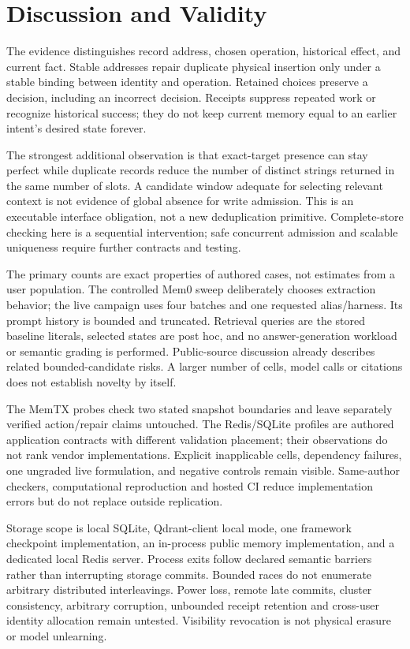 \documentclass[10pt,letterpaper]{article}
\begin{document}


\section{Discussion and Validity}
The evidence distinguishes record address, chosen operation, historical effect, and current fact. Stable addresses repair duplicate physical insertion only under a stable binding between identity and operation. Retained choices preserve a decision, including an incorrect decision. Receipts suppress repeated work or recognize historical success; they do not keep current memory equal to an earlier intent's desired state forever.

The strongest additional observation is that exact-target presence can stay perfect while duplicate records reduce the number of distinct strings returned in the same number of slots. A candidate window adequate for selecting relevant context is not evidence of global absence for write admission. This is an executable interface obligation, not a new deduplication primitive. Complete-store checking here is a sequential intervention; safe concurrent admission and scalable uniqueness require further contracts and testing.

The primary counts are exact properties of authored cases, not estimates from a user population. The controlled Mem0 sweep deliberately chooses extraction behavior; the live campaign uses four batches and one requested alias/harness. Its prompt history is bounded and truncated. Retrieval queries are the stored baseline literals, selected states are post hoc, and no answer-generation workload or semantic grading is performed. Public-source discussion already describes related bounded-candidate risks. A larger number of cells, model calls or citations does not establish novelty by itself.

The MemTX probes check two stated snapshot boundaries and leave separately verified action/repair claims untouched. The Redis/SQLite profiles are authored application contracts with different validation placement; their observations do not rank vendor implementations. Explicit inapplicable cells, dependency failures, one ungraded live formulation, and negative controls remain visible. Same-author checkers, computational reproduction and hosted CI reduce implementation errors but do not replace outside replication.

Storage scope is local SQLite, Qdrant-client local mode, one framework checkpoint implementation, an in-process public memory implementation, and a dedicated local Redis server. Process exits follow declared semantic barriers rather than interrupting storage commits. Bounded races do not enumerate arbitrary distributed interleavings. Power loss, remote late commits, cluster consistency, arbitrary corruption, unbounded receipt retention and cross-user identity allocation remain untested. Visibility revocation is not physical erasure or model unlearning.
\end{document}
